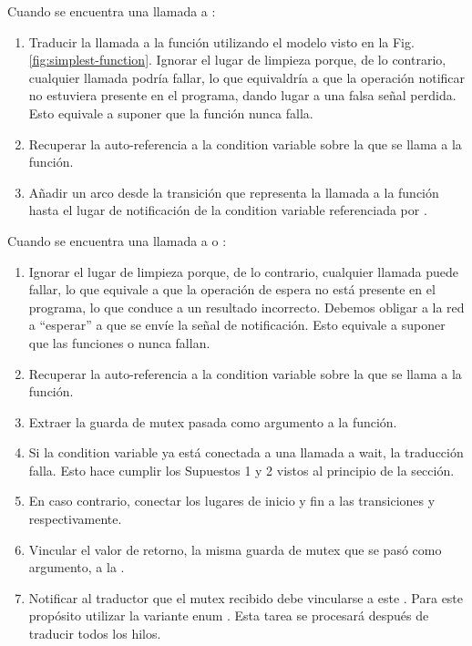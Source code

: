 Cuando se encuentra una llamada a :

\begin{enumerate}
      \item Traducir la llamada a la función utilizando el modelo visto en la Fig. \ref{fig:simplest-function}.
            Ignorar el lugar de limpieza porque, de lo contrario, cualquier llamada podría fallar, lo que equivaldría a
            que la operación notificar no estuviera presente en el programa, dando lugar a una falsa
            señal perdida. Esto equivale a suponer que la función  nunca falla.
      \item Recuperar la auto-referencia  a la condition variable sobre la que se llama a la función.
      \item Añadir un arco desde la transición que representa la llamada a la función hasta el lugar de
            notificación de la condition variable referenciada por .
\end{enumerate}

Cuando se encuentra una llamada a 
o :

\begin{enumerate}
      \item Ignorar el lugar de limpieza porque, de lo contrario, cualquier llamada puede fallar, lo que
            equivale a que la operación de espera no está presente en el programa, lo que conduce a
            un resultado incorrecto. Debemos obligar a la red a ``esperar'' a que se envíe la señal de
            notificación. Esto equivale a suponer que las funciones  o  nunca fallan.
      \item Recuperar la auto-referencia  a la condition variable sobre la que se llama a la función.
      \item Extraer la guarda de mutex pasada como argumento a la función.
      \item Si la condition variable ya está conectada a una llamada a wait, la traducción falla.
            Esto hace cumplir los Supuestos 1 y 2 vistos al principio de la sección.
      \item En caso contrario, conectar los lugares de inicio y fin a las transiciones 
            y  respectivamente.
      \item Vincular el valor de retorno, la misma guarda de mutex que se pasó como argumento, a la .
      \item Notificar al traductor que el mutex recibido debe vincularse a este .
            Para este propósito utilizar la variante enum .
            Esta tarea se procesará después de traducir todos los hilos.
\end{enumerate}

